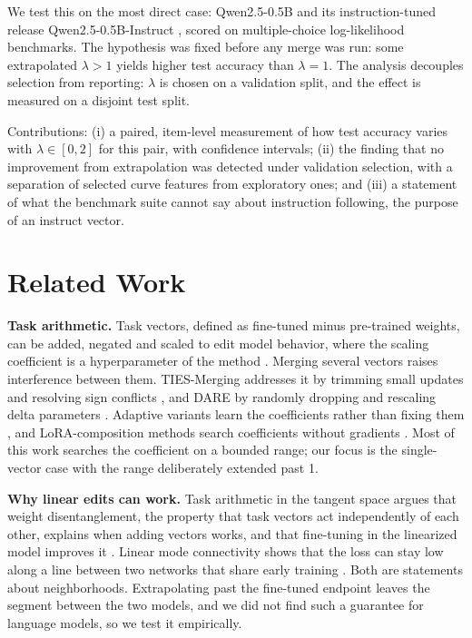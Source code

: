 \documentclass[conference]{IEEEtran}
\begin{document}
We test this on the most direct case: Qwen2.5-0.5B and its instruction-tuned release Qwen2.5-0.5B-Instruct \cite{qwen25}, scored on multiple-choice log-likelihood benchmarks. The hypothesis was fixed before any merge was run: some extrapolated $\lambda>1$ yields higher test accuracy than $\lambda=1$. The analysis decouples selection from reporting: $\lambda$ is chosen on a validation split, and the effect is measured on a disjoint test split.

Contributions: (i) a paired, item-level measurement of how test accuracy varies with $\lambda\in[0,2]$ for this pair, with confidence intervals; (ii) the finding that no improvement from extrapolation was detected under validation selection, with a separation of selected curve features from exploratory ones; and (iii) a statement of what the benchmark suite cannot say about instruction following, the purpose of an instruct vector.

\section{Related Work}
\textbf{Task arithmetic.} Task vectors, defined as fine-tuned minus pre-trained weights, can be added, negated and scaled to edit model behavior, where the scaling coefficient is a hyperparameter of the method \cite{ilharco2022editing}. Merging several vectors raises interference between them. TIES-Merging addresses it by trimming small updates and resolving sign conflicts \cite{yadav2023ties}, and DARE by randomly dropping and rescaling delta parameters \cite{yu2023dare}. Adaptive variants learn the coefficients rather than fixing them \cite{yang2023adamerging}, and LoRA-composition methods search coefficients without gradients \cite{huang2023lorahub}. Most of this work searches the coefficient on a bounded range; our focus is the single-vector case with the range deliberately extended past 1.

\textbf{Why linear edits can work.} Task arithmetic in the tangent space argues that weight disentanglement, the property that task vectors act independently of each other, explains when adding vectors works, and that fine-tuning in the linearized model improves it \cite{ortizjimenez2023tangent}. Linear mode connectivity shows that the loss can stay low along a line between two networks that share early training \cite{frankle2020lmc}. Both are statements about neighborhoods. Extrapolating past the fine-tuned endpoint leaves the segment between the two models, and we did not find such a guarantee for language models, so we test it empirically.
\end{document}

